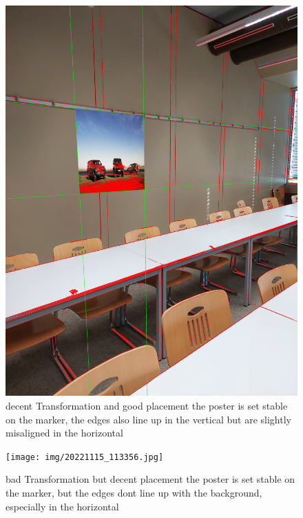 \documentclass[a4paper,twocolumn]{article}
\begin{document}
    \begin{figure}[h!]
    \centering
    \includegraphics[width=0.9\columnwidth]{img/20221115_113346.jpg} %
    \caption{decent Transformation and good placement the poster is set stable on the marker, the edges also line up in the vertical but are slightly misaligned in the horizontal }
    \label{fig:20221115_113346.jpg}
    \end{figure}
    
    \begin{figure}[h!]
    \centering
    \texttt{[image: img/20221115\_113356.jpg]} %
    \caption{bad Transformation but decent placement the poster is set stable on the marker, but the edges dont line up with the background, especially in the horizontal}
    \label{fig:20221115_113356.jpg}
    \end{figure}
    
\end{document}
